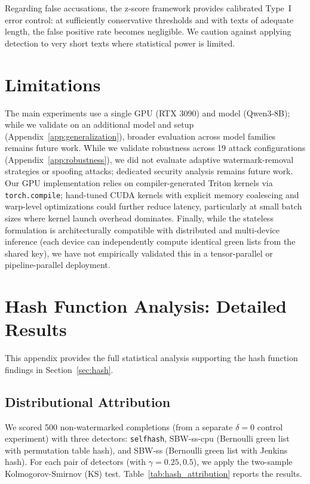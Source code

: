 \documentclass[11pt]{article}
\begin{document}
Regarding false accusations, the z-score framework provides calibrated Type~I error control: at sufficiently conservative thresholds and with texts of adequate length, the false positive rate becomes negligible. We caution against applying detection to very short texts where statistical power is limited.

\section{Limitations}

The main experiments use a single GPU (RTX 3090) and model (Qwen3-8B); while we validate on an additional model and setup (Appendix~\ref{app:generalization}), broader evaluation across model families remains future work. While we validate robustness across 19 attack configurations (Appendix~\ref{app:robustness}), we did not evaluate adaptive watermark-removal strategies or spoofing attacks; dedicated security analysis remains future work. Our GPU implementation relies on compiler-generated Triton kernels via \texttt{torch.compile}; hand-tuned CUDA kernels with explicit memory coalescing and warp-level optimizations could further reduce latency, particularly at small batch sizes where kernel launch overhead dominates. Finally, while the stateless formulation is architecturally compatible with distributed and multi-device inference (each device can independently compute identical green lists from the shared key), we have not empirically validated this in a tensor-parallel or pipeline-parallel deployment.



\appendix

\section{Hash Function Analysis: Detailed Results}
\label{app:hash}

This appendix provides the full statistical analysis supporting the hash function findings in Section~\ref{sec:hash}.

\subsection{Distributional Attribution}

We scored 500 non-watermarked completions (from a separate $\delta=0$ control experiment) with three detectors: \texttt{selfhash}, SBW-ss-cpu (Bernoulli green list with permutation table hash), and SBW-ss (Bernoulli green list with Jenkins hash). For each pair of detectors (with $\gamma=0.25, 0.5$), we apply the two-sample Kolmogorov-Smirnov (KS) test. Table~\ref{tab:hash_attribution} reports the results.
\end{document}
